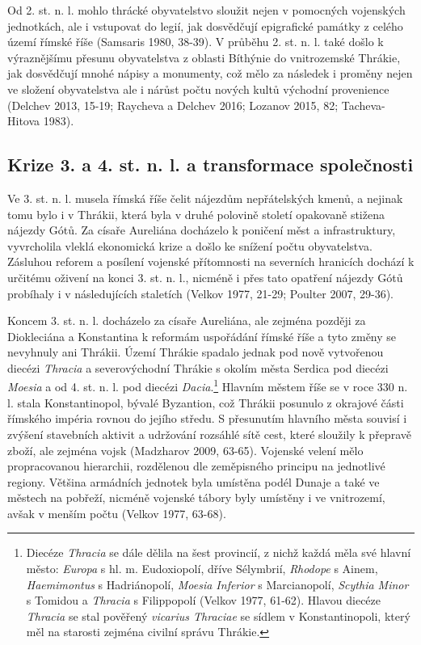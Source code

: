 Od 2. st. n. l. mohlo thrácké obyvatelstvo sloužit nejen v pomocných vojenských jednotkách, ale i vstupovat do legií, jak dosvědčují epigrafické památky z celého území římské říše (Samsaris 1980, 38-39). V průběhu 2. st. n. l. také došlo k výraznějšímu přesunu obyvatelstva z oblasti Bíthýnie do vnitrozemské Thrákie, jak dosvědčují mnohé nápisy a monumenty, což mělo za následek i proměny nejen ve složení obyvatelstva ale i nárůst počtu nových kultů východní provenience (Delchev 2013, 15-19; Raycheva a Delchev 2016; Lozanov 2015, 82; Tacheva-Hitova 1983).

\subsection[krize-3.-a-4.-st.-n.-l.-a-transformace-společnosti]{Krize 3. a 4. st. n. l. a transformace společnosti}

Ve 3. st. n. l. musela římská říše čelit nájezdům nepřátelských kmenů, a nejinak tomu bylo i v Thrákii, která byla v druhé polovině století opakovaně stižena nájezdy Gótů. Za císaře Aureliána docházelo k poničení měst a infrastruktury, vyvrcholila vleklá ekonomická krize a došlo ke snížení počtu obyvatelstva. Zásluhou reforem a posílení vojenské přítomnosti na severních hranicích dochází k určitému oživení na konci 3. st. n. l., nicméně i přes tato opatření nájezdy Gótů probíhaly i v následujících staletích (Velkov 1977, 21-29; Poulter 2007, 29-36).

Koncem 3. st. n. l. docházelo za císaře Aureliána, ale zejména později za Diokleciána a Konstantina k reformám uspořádání římské říše a tyto změny se nevyhnuly ani Thrákii. Území Thrákie spadalo jednak pod nově vytvořenou diecézi {\em Thracia} a severovýchodní Thrákie s okolím města Serdica pod diecézi {\em Moesia} a od 4. st. n. l. pod diecézi {\em Dacia}.\footnote{Diecéze {\em Thracia} se dále dělila na šest provincií, z nichž každá měla své hlavní město: {\em Europa} s hl. m. Eudoxiopolí, dříve Sélymbrií, {\em Rhodope} s Ainem, {\em Haemimontus} s Hadriánopolí, {\em Moesia Inferior} s Marcianopolí, {\em Scythia Minor} s Tomidou a {\em Thracia} s Filippopolí (Velkov 1977, 61-62). Hlavou diecéze {\em Thracia} se stal pověřený {\em vicarius Thraciae} se sídlem v Konstantinopoli, který měl na starosti zejména civilní správu Thrákie.} Hlavním městem říše se v roce 330 n. l. stala Konstantinopol, bývalé Byzantion, což Thrákii posunulo z okrajové části římského impéria rovnou do jejího středu. S přesunutím hlavního města souvisí i zvýšení stavebních aktivit a udržování rozsáhlé sítě cest, které sloužily k přepravě zboží, ale zejména vojsk (Madzharov 2009, 63-65). Vojenské velení mělo propracovanou hierarchii, rozdělenou dle zeměpisného principu na jednotlivé regiony. Většina armádních jednotek byla umístěna podél Dunaje a také ve městech na pobřeží, nicméně vojenské tábory byly umístěny i ve vnitrozemí, avšak v menším počtu (Velkov 1977, 63-68).

